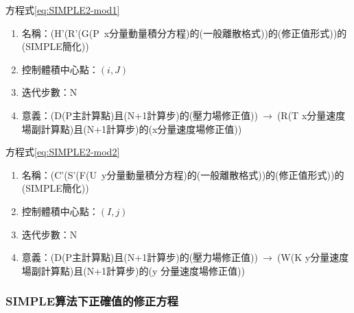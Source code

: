 \documentclass[12pt]{article}
\theoremstyle{upright}
\begin{document}
\noindent 方程式\eqref{eq:SIMPLE2-mod1}
\begin{enumerate}
    \item 名稱：(H'(R'(G(P\ x分量動量積分方程)的(一般離散格式))的(修正值形式))的(SIMPLE簡化))
    \item 控制體積中心點：$(i,J)$
    \item 迭代步數：N
    \item 意義：(D(P主計算點)且(N+1計算步)的(壓力場修正值))$\ \rightarrow\ $(R(T x分量速度場副計算點)且(N+1計算步)的(x分量速度場修正值))
\end{enumerate}
\noindent 方程式\eqref{eq:SIMPLE2-mod2}
\begin{enumerate}
    \item 名稱：(C'(S'(F(U\ y分量動量積分方程)的(一般離散格式))的(修正值形式))的(SIMPLE簡化))
    \item 控制體積中心點：$(I,j)$
    \item 迭代步數：N
    \item 意義：(D(P主計算點)且(N+1計算步)的(壓力場修正值))$\ \rightarrow\ $(W(K y分量速度場副計算點)且(N+1計算步)的(y 分量速度場修正值))
\end{enumerate}
\subsubsection{SIMPLE算法下正確值的修正方程}
\label{subsubsection:simple-accu}
\end{document}
